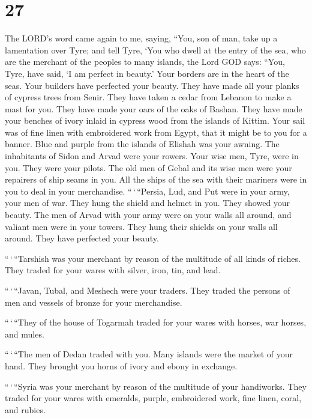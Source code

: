 \hypertarget{section-25}{%
\section{27}\label{section-25}}

 The LORD's word came again to me, saying, 
``You, son of man, take up a lamentation over Tyre;  and
tell Tyre, `You who dwell at the entry of the sea, who are the merchant
of the peoples to many islands, the Lord GOD says: ``You, Tyre, have
said, `I am perfect in beauty.'  Your borders are in the
heart of the seas. Your builders have perfected your beauty.
 They have made all your planks of cypress trees from Senir.
They have taken a cedar from Lebanon to make a mast for you.
 They have made your oars of the oaks of Bashan. They have
made your benches of ivory inlaid in cypress wood from the islands of
Kittim.  Your sail was of fine linen with embroidered work
from Egypt, that it might be to you for a banner. Blue and purple from
the islands of Elishah was your awning.  The inhabitants of
Sidon and Arvad were your rowers. Your wise men, Tyre, were in you. They
were your pilots.  The old men of Gebal and its wise men
were your repairers of ship seams in you. All the ships of the sea with
their mariners were in you to deal in your merchandise. 
``\,`\,``Persia, Lud, and Put were in your army, your men of war. They
hung the shield and helmet in you. They showed your beauty.
 The men of Arvad with your army were on your walls all
around, and valiant men were in your towers. They hung their shields on
your walls all around. They have perfected your beauty.

 ``\,`\,``Tarshish was your merchant by reason of the
multitude of all kinds of riches. They traded for your wares with
silver, iron, tin, and lead.

 ``\,`\,``Javan, Tubal, and Meshech were your traders. They
traded the persons of men and vessels of bronze for your merchandise.

 ``\,`\,``They of the house of Togarmah traded for your
wares with horses, war horses, and mules.

 ``\,`\,``The men of Dedan traded with you. Many islands
were the market of your hand. They brought you horns of ivory and ebony
in exchange.

 ``\,`\,``Syria was your merchant by reason of the
multitude of your handiworks. They traded for your wares with emeralds,
purple, embroidered work, fine linen, coral, and rubies.

